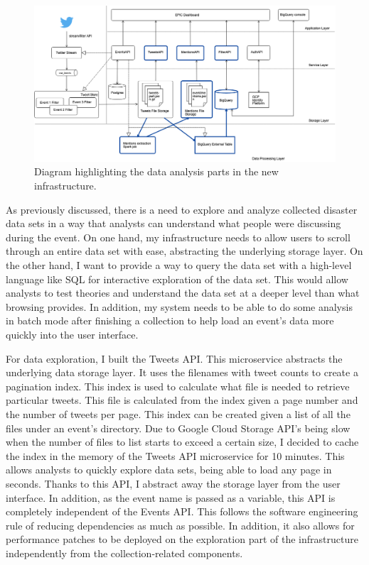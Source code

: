 \begin{figure}[htbp]
	\caption{\label{fig:newinfraanalysis}
	Diagram highlighting the data analysis parts in the new infrastructure.
	}
    \begin{center}
	\includegraphics[width=150mm]{figs/infrav1_analysis.png}
    \end{center}
\label{xfigDiagram}
\end{figure}

As previously discussed, there is a need to explore and analyze collected disaster data sets in a way that analysts can understand what people were discussing during the event. On one hand, my infrastructure needs to allow users to scroll through an entire data set with ease, abstracting the underlying storage layer. On the other hand, I want to provide a way to query the data set with a high-level language like SQL for interactive exploration of the data set. This would allow analysts to test theories and understand the data set at a deeper level than what browsing provides. In addition, my system needs to be able to do some analysis in batch mode after finishing a collection to help load an event's data more quickly into the user interface.

For data exploration, I built the Tweets API. This microservice abstracts the underlying data storage layer. It uses the filenames with tweet counts to create a pagination index. This index is used to calculate what file is needed to retrieve particular tweets. This file is calculated from the index given a page number and the number of tweets per page. This index can be created given a list of all the files under an event's directory. Due to Google Cloud Storage API’s being slow when the number of files to list starts to exceed a certain size, I decided to cache the index in the memory of the Tweets API microservice for 10 minutes. This allows analysts to quickly explore data sets, being able to load any page in seconds. Thanks to this API, I abstract away the storage layer from the user interface. In addition, as the event name is passed as a variable, this API is completely independent of the Events API. This follows the software engineering rule of reducing dependencies as much as possible. In addition, it also allows for performance patches to be deployed on the exploration part of the infrastructure independently from the collection-related components.

